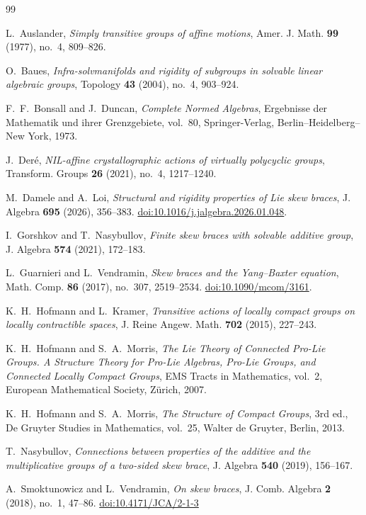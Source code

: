 \documentclass[reqno]{amsart}
\numberwithin{equation}{section}
\theoremstyle{definition}
\theoremstyle{remark}
\begin{document}
\begin{thebibliography}{99}

L.~Auslander,
\emph{Simply transitive groups of affine motions},
Amer. J. Math. \textbf{99} (1977), no.~4, 809--826.

O.~Baues,
\emph{Infra-solvmanifolds and rigidity of subgroups in solvable linear algebraic groups},
Topology \textbf{43} (2004), no.~4, 903--924.

F.~F.~Bonsall and J.~Duncan,
\emph{Complete Normed Algebras},
Ergebnisse der Mathematik und ihrer Grenzgebiete, vol.~80,
Springer-Verlag, Berlin--Heidelberg--New York, 1973.



J.~Der\'e,
\emph{NIL-affine crystallographic actions of virtually polycyclic groups},
Transform. Groups \textbf{26} (2021), no.~4, 1217--1240.

M.~Damele and A.~Loi,
\emph{Structural and rigidity properties of Lie skew braces},
J. Algebra \textbf{695} (2026), 356--383.
\href{https://doi.org/10.1016/j.jalgebra.2026.01.048}{doi:10.1016/j.jalgebra.2026.01.048}.


I.~Gorshkov and T.~Nasybullov,
\emph{Finite skew braces with solvable additive group},
J. Algebra \textbf{574} (2021), 172--183.

L.~Guarnieri and L.~Vendramin,
\emph{Skew braces and the Yang--Baxter equation},
Math. Comp. \textbf{86} (2017), no.~307, 2519--2534.
\href{https://doi.org/10.1090/mcom/3161}{doi:10.1090/mcom/3161}.

K.~H.~Hofmann and L.~Kramer,
\emph{Transitive actions of locally compact groups on locally contractible spaces},
J. Reine Angew. Math. \textbf{702} (2015), 227--243.

K.~H.~Hofmann and S.~A.~Morris,
\emph{The Lie Theory of Connected Pro-Lie Groups. A Structure Theory for Pro-Lie Algebras, Pro-Lie Groups, and Connected Locally Compact Groups},
EMS Tracts in Mathematics, vol.~2, European Mathematical Society, Z\"urich, 2007.



K.~H.~Hofmann and S.~A.~Morris,
\emph{The Structure of Compact Groups}, 3rd ed.,
De Gruyter Studies in Mathematics, vol.~25, Walter de Gruyter, Berlin, 2013.


T.~Nasybullov,
\emph{Connections between properties of the additive and the multiplicative groups of a two-sided skew brace},
J. Algebra \textbf{540} (2019), 156--167.

A.~Smoktunowicz and L.~Vendramin,
\emph{On skew braces},
J. Comb. Algebra \textbf{2} (2018), no.~1, 47--86.
\href{https://doi.org/10.4171/JCA/2-1-3}{doi:10.4171/JCA/2-1-3}



\end{thebibliography}
\end{document}
